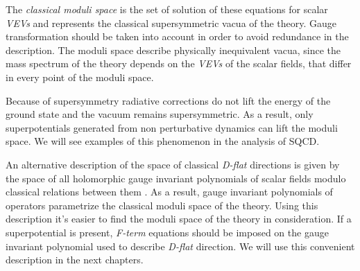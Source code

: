 The \emph{classical moduli space} is the set of solution of these equations for scalar \emph{VEVs} and represents the classical supersymmetric vacua of the theory. 
Gauge transformation should be taken into account in order to avoid redundance in the description.
The moduli space describe physically inequivalent vacua, since the mass spectrum of the theory depends on the \emph{VEVs} of the scalar fields, that differ in every point of the moduli space. 

Because of supersymmetry radiative corrections do not lift the energy of the ground state and the vacuum remains supersymmetric.
As a result, only superpotentials generated from non perturbative dynamics can lift the moduli space. 
We will see examples of this phenomenon in the analysis of SQCD.

An alternative description of the space of classical \emph{D-flat} directions is given by the space of all holomorphic gauge invariant polynomials of scalar fields modulo classical relations between them \cite{Luty:1995sd}.
As a result, gauge invariant polynomials of operators parametrize the classical moduli space of the theory. 
Using this description it's easier to find the moduli space of the theory in consideration.
If a superpotential is present, \emph{F-term} equations should be imposed on the gauge invariant polynomial used to describe \emph{D-flat} direction.
We will use this convenient description in the next chapters.










